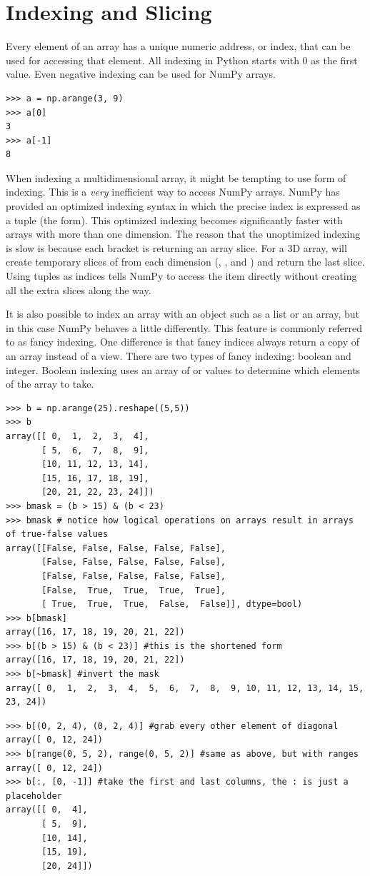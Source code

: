 \section*{Indexing and Slicing}
Every element of an array has a unique numeric address, or index, that can be used for accessing that element.
All indexing in Python starts with 0 as the first value.
Even negative indexing can be used for NumPy arrays.
\begin{lstlisting}
>>> a = np.arange(3, 9)
>>> a[0]
3
>>> a[-1]
8
\end{lstlisting}
When indexing a multidimensional array, it might be tempting to use  form of indexing.
This is a \emph{very} inefficient way to access NumPy arrays.
NumPy has provided an optimized indexing syntax in which the precise index is expressed as a tuple (the  form).  This optimized indexing becomes significantly faster with arrays with more than one dimension.
The reason that the unoptimized indexing is slow is because each bracket is returning an array slice.  
For a 3D array,  will create temporary slices of  from each dimension (, , and ) and return the last slice.
Using tuples as indices tells NumPy to access the item directly without creating all the extra slices along the way.

It is also possible to index an array with an object such as a list or an array, but in this case NumPy behaves a little differently.
This feature is commonly referred to as fancy indexing.
One difference is that fancy indices always return a copy of an array instead of a view.
There are two types of fancy indexing: boolean and integer.
Boolean indexing uses an array of  or  values to determine which elements of the array to take.
\begin{lstlisting}
>>> b = np.arange(25).reshape((5,5))
>>> b
array([[ 0,  1,  2,  3,  4],
       [ 5,  6,  7,  8,  9],
       [10, 11, 12, 13, 14],
       [15, 16, 17, 18, 19],
       [20, 21, 22, 23, 24]])
>>> bmask = (b > 15) & (b < 23)
>>> bmask # notice how logical operations on arrays result in arrays of true-false values
array([[False, False, False, False, False],
       [False, False, False, False, False],
       [False, False, False, False, False],
       [False,  True,  True,  True,  True],
       [ True,  True,  True,  False,  False]], dtype=bool)
>>> b[bmask]
array([16, 17, 18, 19, 20, 21, 22])
>>> b[(b > 15) & (b < 23)] #this is the shortened form
array([16, 17, 18, 19, 20, 21, 22])
>>> b[~bmask] #invert the mask
array([ 0,  1,  2,  3,  4,  5,  6,  7,  8,  9, 10, 11, 12, 13, 14, 15, 23, 24])
\end{lstlisting}
\begin{lstlisting}
>>> b[(0, 2, 4), (0, 2, 4)] #grab every other element of diagonal
array([ 0, 12, 24])
>>> b[range(0, 5, 2), range(0, 5, 2)] #same as above, but with ranges
array([ 0, 12, 24])
>>> b[:, [0, -1]] #take the first and last columns, the : is just a placeholder
array([[ 0,  4],
       [ 5,  9],
       [10, 14],
       [15, 19],
       [20, 24]])
\end{lstlisting}

